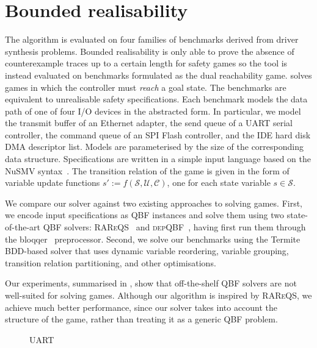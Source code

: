 \section{Bounded realisability}

The algorithm is evaluated on four families of benchmarks derived from driver synthesis problems. Bounded realisability is only able to prove the absence of counterexample traces up to a certain length for safety games so the tool is instead evaluated on benchmarks formulated as the dual reachability game. \eva solves games in which the controller must \emph{reach} a goal state. The benchmarks are equivalent to unrealisable safety specifications.  Each benchmark models the data path of one of four I/O devices in the abstracted form.  In particular, we model the transmit buffer of an Ethernet adapter, the send queue of a UART serial controller, the command queue of an SPI Flash controller, and the IDE hard disk DMA descriptor list.   Models are parameterised by the size of the corresponding data structure.  Specifications are written in a simple input language based on the NuSMV syntax~\cite{Henzinger03}.   The transition relation of the game is given in the form of variable update functions $s' := f(\mathcal{S}, \mathcal{U}, \mathcal{C})$, one for each state variable $s \in \mathcal{S}$.

We compare our solver against two existing approaches to solving games.  First, we encode input specifications as QBF instances and solve them using two state-of-the-art QBF solvers: \textsc{RAReQS}~\cite{Janota12} and \textsc{depQBF}~\cite{Lonsing10}, having first run them through the bloqqer~\cite{Biere11} preprocessor.  Second, we solve our benchmarks using the Termite~\cite{Walker14} BDD-based solver that uses dynamic variable reordering, variable grouping, transition relation partitioning, and other optimisations. 

Our experiments, summarised in , show that off-the-shelf QBF solvers are not well-suited for solving games.  Although our algorithm is inspired by \textsc{RAReQS}, we achieve much better performance, since our solver takes into account the structure of the game, rather than treating it as a generic QBF problem.  

\begin{figure}[ht]
    \centering
    \pgfplotsset{width=\textwidth, height=0.5\textheight}
    \caption{UART}
    \label{fig:uart}
\end{figure}

